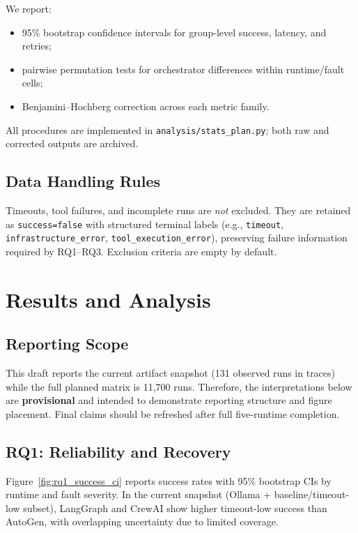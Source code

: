 We report:
\begin{itemize}
    \item 95\% bootstrap confidence intervals for group-level success, latency, and retries;
    \item pairwise permutation tests for orchestrator differences within runtime/fault cells;
    \item Benjamini--Hochberg correction across each metric family.
\end{itemize}

All procedures are implemented in \texttt{analysis/stats\_plan.py}; both raw and corrected outputs are archived.

\subsection{Data Handling Rules}
\label{sec:data_handling}

Timeouts, tool failures, and incomplete runs are \emph{not} excluded. They are retained as \texttt{success=false} with structured terminal labels (e.g., \texttt{timeout}, \texttt{infrastructure\_error}, \texttt{tool\_execution\_error}), preserving failure information required by RQ1--RQ3. Exclusion criteria are empty by default.

\section{Results and Analysis}
\label{sec:results}

\subsection{Reporting Scope}

This draft reports the current artifact snapshot (131 observed runs in traces) while the full planned matrix is 11,700 runs. Therefore, the interpretations below are \textbf{provisional} and intended to demonstrate reporting structure and figure placement. Final claims should be refreshed after full five-runtime completion.

\subsection{RQ1: Reliability and Recovery}
\label{sec:rq1_results}

Figure~\ref{fig:rq1_success_ci} reports success rates with 95\% bootstrap CIs by runtime and fault severity. In the current snapshot (Ollama + baseline/timeout-low subset), LangGraph and CrewAI show higher timeout-low success than AutoGen, with overlapping uncertainty due to limited coverage.

